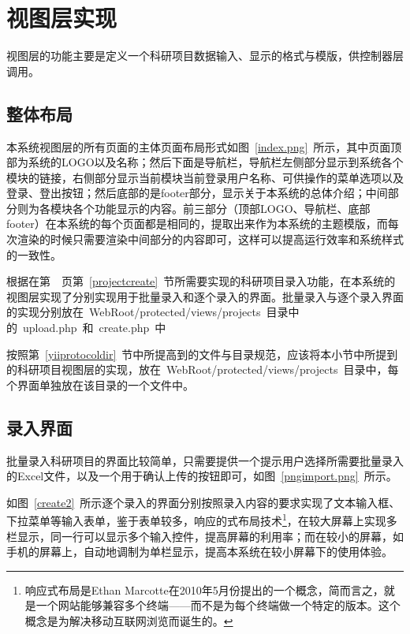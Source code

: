 \section{视图层实现}
视图层的功能主要是定义一个科研项目数据输入、显示的格式与模版，供控制器层调用。
\subsection{整体布局}

本系统视图层的所有页面的主体页面布局形式如图~\ref{index.png}~所示，其中页面顶部为系统的LOGO以及名称；然后下面是导航栏，导航栏左侧部分显示到系统各个模块的链接，右侧部分显示当前模块当前登录用户名称、可供操作的菜单选项以及登录、登出按钮；然后底部的是footer部分，显示关于本系统的总体介绍；中间部分则为各模块各个功能显示的内容。前三部分（顶部LOGO、导航栏、底部footer）在本系统的每个页面都是相同的，提取出来作为本系统的主题模版，而每次渲染的时候只需要渲染中间部分的内容即可，这样可以提高运行效率和系统样式的一致性。

根据在第~\pageref{projectcreate}~页第~\ref{projectcreate}~节所需要实现的科研项目录入功能，在本系统的视图层实现了分别实现用于批量录入和逐个录入的界面。批量录入与逐个录入界面的实现分别放在~WebRoot/protected/views/projects~目录中的~upload.php~和~create.php~中


按照第~\ref{yiiprotocoldir}~节中所提高到的文件与目录规范，应该将本小节中所提到的科研项目视图层的实现，放在~WebRoot/protected/views/projects~目录中，每个界面单独放在该目录的一个文件中。

\subsection{录入界面}
\label{projectcreateview}

批量录入科研项目的界面比较简单，只需要提供一个提示用户选择所需要批量录入的Excel文件，以及一个用于确认上传的按钮即可，如图~\ref{pngimport.png}~所示。


如图~\ref{create2}~所示逐个录入的界面分别按照录入内容的要求实现了文本输入框、下拉菜单等输入表单，鉴于表单较多，响应的式布局技术\footnote{响应式布局是Ethan Marcotte在2010年5月份提出的一个概念，简而言之，就是一个网站能够兼容多个终端——而不是为每个终端做一个特定的版本。这个概念是为解决移动互联网浏览而诞生的。}，在较大屏幕上实现多栏显示，同一行可以显示多个输入控件，提高屏幕的利用率；而在较小的屏幕，如手机的屏幕上，自动地调制为单栏显示，提高本系统在较小屏幕下的使用体验。

